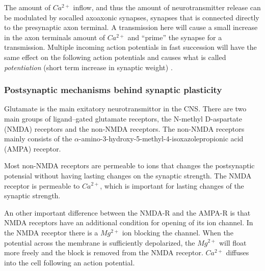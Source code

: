 The amount of $Ca^{2+}$ inflow, and thus the amount of neurotransmitter release can be modulated by socalled axoaxonic synapses\cite{NeuroscienceExploringTheBrain3edKAP5}, synapses that is connected directly to the presynaptic axon terminal. 
A transmission here will cause a small increase in the axon terminals amount of $Ca^{2+}$ and ``prime'' the synapse for a transmission. 
Multiple incoming action potentials in fast succession will have the same effect on the following action potentials and causes what is called \emph{potentiation} (short term increase in synaptic weight)
\cite{PrinciplesOfNeuralScience4edKAP14}. 




\subsubsection{Postsynaptic mechanisms behind synaptic plasticity}
Glutamate is the main exitatory neurotransmittor in the CNS\cite{PrinciplesOfAnatomyAndPhysiology12edKAP12}. %
There are two main groups of ligand--gated glutamate receptors, the N-methyl D-aspartate (NMDA) receptors and the non-NMDA receptors. 
The non-NMDA receptors mainly consists of the $\alpha$-amino-3-hydroxy-5-methyl-4-isoxazolepropionic acid (AMPA) receptor. %

Most non-NMDA receptors are permeable to ions that changes the postsynaptic potensial without having lasting changes on the synaptic strength.%
The NMDA receptor is permeable to $Ca^{2+}$, which is important for lasting changes of the synaptic strength. %

An other important difference between the NMDA-R and the AMPA-R is that NMDA receptors have an additional condition for opening of its ion channel. 
In the NMDA receptor there is a $Mg^{2+}$ ion blocking the channel. 
When the potential across the membrane is sufficiently depolarized, the $Mg^{2+}$ will float more freely and the block is removed from the NMDA receptor.
$Ca^{2+}$ diffuses into the cell following an action potential\cite{PrinciplesOfNeuralScience4edKAP12}.

